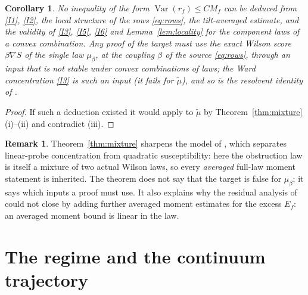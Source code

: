 \documentclass[11pt]{article}
\newtheorem{corollary}[theorem]{Corollary}
\theoremstyle{definition}
\newtheorem{remark}[theorem]{Remark}
\newcommand{\Var}{\operatorname{Var}}
\begin{document}
\begin{corollary}\label{cor:obstruction}
No inequality of the form $\Var(r_f)\le CM_f$ can be deduced from \ref{I1}, \ref{I2}, the local structure of the
rows \eqref{eq:rows}, the tilt-averaged estimate, and the validity of \ref{I3}, \ref{I5}, \ref{I6} and
Lemma~\ref{lem:locality} for the component laws of a convex combination. Any proof of the target must use the
exact Wilson score $\beta\nabla S$ of the single law $\mu_\beta$, at the coupling $\beta$ of the source
\eqref{eq:rows}, through an input that is not stable under convex combinations of laws; the Ward concentration
\ref{I3} is such an input (it fails for $\tilde\mu$), and so is the resolvent identity of \cite[subsection ``The actual retained susceptibility'']{cur}.
\end{corollary}
\begin{proof}
If such a deduction existed it would apply to $\tilde\mu$ by Theorem~\ref{thm:mixture}(i)--(ii) and contradict (iii).
\end{proof}

\begin{remark}
Theorem~\ref{thm:mixture} sharpens the model of \cite[subsection ``Why these linear estimates leave the ordinary susceptibility open'']{dmn}, which separates linear-probe
concentration from quadratic susceptibility: here the obstruction law is itself a mixture of two actual Wilson laws,
so every \emph{averaged} full-law moment statement is inherited. The theorem does not say that the target is false
for $\mu_\beta$; it says which inputs a proof must use. It also explains why the residual analysis of
\cite[final subsection]{tra} could not close by adding further averaged moment estimates for the excess $E_f$: an averaged
moment bound is linear in the law.
\end{remark}

\section{The regime and the continuum trajectory}\label{sec:regime}
\end{document}
